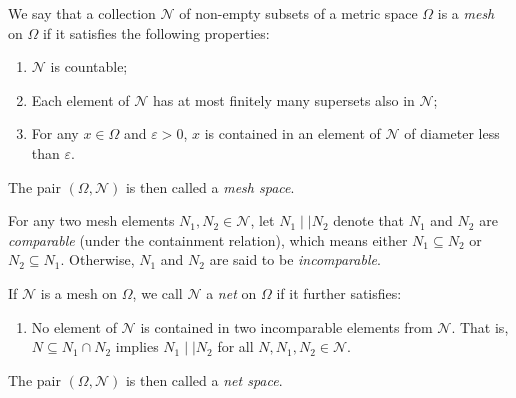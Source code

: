\begin{definition}
    We say that a collection $\mathcal{N}$ of non-empty subsets of a metric space $\Omega$ is a \textit{mesh} on $\Omega$ if it satisfies the following properties:
    \begin{enumerate}
        \item[(\textbf{M1})] $\mathcal{N}$ is countable;
        \item[(\textbf{M2})] Each element of $\mathcal{N}$ has at most finitely many supersets also in $\mathcal{N}$; 
        \item[(\textbf{M3})] For any $x \in \Omega$ and $\varepsilon > 0$, $x$ is contained in an element of $\mathcal{N}$ of diameter less than $\varepsilon$. 
    \end{enumerate}
    The pair $(\Omega, \mathcal{N})$ is then called a \textit{mesh space}.
\end{definition}

For any two mesh elements $N_1, N_2 \in \mathcal{N}$, let $N_1 \mid\mid N_2$ denote that $N_1$ and $N_2$ are \textit{comparable} (under the containment relation), which means either $N_1 \subseteq N_2$ or $N_2 \subseteq N_1$. Otherwise, $N_1$ and $N_2$ are said to be \textit{incomparable}. 

\begin{definition}
    If $\mathcal{N}$ is a mesh on $\Omega$, we call $\mathcal{N}$ a \textit{net} on $\Omega$ if it further satisfies:
    \begin{enumerate}[label=(\roman*)]
        \item[(\textbf{N4})] No element of $\mathcal{N}$ is contained in two incomparable elements from $\mathcal{N}$. That is, $N \subseteq N_1 \cap N_2$ implies $N_1 \mid \mid N_2$ for all $N, N_1, N_2 \in \mathcal{N}$.
    \end{enumerate}
    The pair $(\Omega, \mathcal{N})$ is then called a \textit{net space}.
\end{definition}

